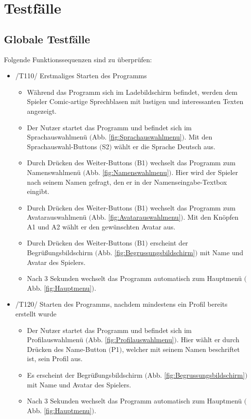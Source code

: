 \section{Testfälle}


\subsection{Globale Testfälle}
Folgende Funktionssequenzen sind zu überprüfen:

\begin{itemize}
\item /T110/ Erstmaliges Starten des Programms
\begin{itemize}
\item Während das Programm sich im Ladebildschirm befindet, werden dem Spieler Comic-artige Sprechblasen mit lustigen und interessanten Texten angezeigt.
\item Der Nutzer startet das Programm und befindet sich im Sprachauswahlmenü $($Abb. \ref{fig:Sprachauswahlmenu}$)$. Mit den Sprachauswahl-Buttons $($S2$)$ wählt er die Sprache Deutsch aus.
\item Durch Drücken des Weiter-Buttons $($B1$)$ wechselt das Programm zum Namenswahlmenü $($Abb. \ref{fig:Namenswahlmenu}$)$. Hier wird der Spieler nach seinem Namen gefragt, den er in der Namenseingabe-Textbox eingibt.
\item Durch Drücken des  Weiter-Buttons $($B1$)$ wechselt das Programm zum Avatarauswahlmenü $($Abb. \ref{fig:Avatarauswahlmenu}$)$.
 Mit den Knöpfen A1 und A2 wählt er den gewünschten Avatar aus.
\item Durch Drücken des Weiter-Buttons $($B1$)$ erscheint der Begrüßungsbildschirm $($Abb. \ref{fig:Begrussungsbildschirm}$)$ mit Name und Avatar des Spielers.
\item Nach 3 Sekunden wechselt das Programm automatisch zum Hauptmenü $($Abb. \ref{fig:Hauptmenu}$)$.
\end{itemize}

\item /T120/ Starten des Programms, nachdem mindestens ein Profil bereits erstellt wurde
\begin{itemize}
\item Der Nutzer startet das Programm und befindet sich im Profilauswahlmenü $($Abb. \ref{fig:Profilauswahlmenu}$)$. Hier wählt er durch Drücken des Name-Button $($P1$)$, welcher mit seinem Namen beschriftet ist, sein Profil aus.
\item Es erscheint der Begrüßungsbildschirm $($Abb. \ref{fig:Begrussungsbildschirm}$)$ mit Name und Avatar des Spielers.
\item Nach 3 Sekunden wechselt das Programm automatisch zum Hauptmenü $($Abb. \ref{fig:Hauptmenu}$)$.
\end{itemize}


\end{itemize}
